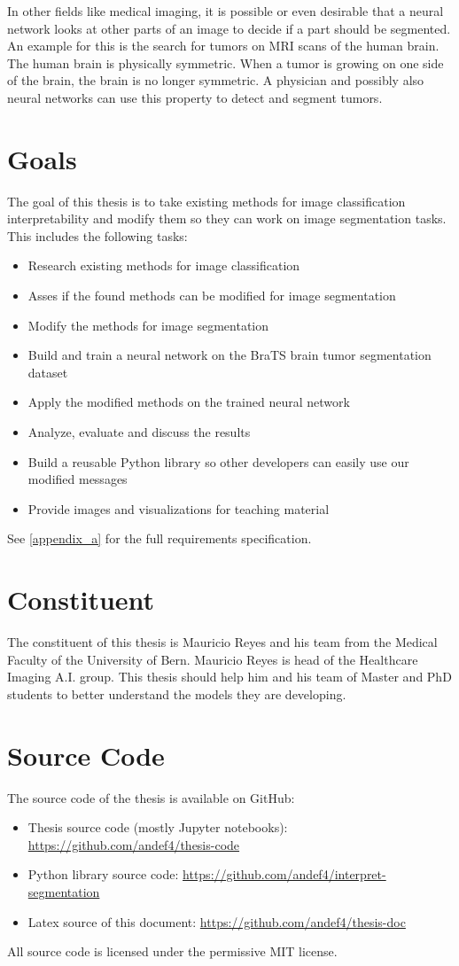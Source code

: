 In other fields like medical imaging, it is possible or even desirable that a neural network looks at other parts of an image to decide if a part should be segmented. An example for this is the search for tumors on MRI scans of the human brain. The human brain is physically symmetric. When a tumor is growing on one side of the brain, the brain is no longer symmetric. A physician and possibly also neural networks can use this property to detect and segment tumors.

\section{Goals}
The goal of this thesis is to take existing methods for image classification interpretability and modify them so they can work on image segmentation tasks. This includes the following tasks:
\begin{itemize}
    \item Research existing methods for image classification
    \item Asses if the found methods can be modified for image segmentation
    \item Modify the methods for image segmentation
    \item Build and train a neural network on the BraTS brain tumor segmentation dataset
    \item Apply the modified methods on the trained neural network
    \item Analyze, evaluate and discuss the results
    \item Build a reusable Python library so other developers can easily use our modified messages
    \item Provide images and visualizations for teaching material
\end{itemize}

See \autoref{appendix_a} for the full requirements specification.

\section{Constituent}
The constituent of this thesis is Mauricio Reyes and his team from the Medical Faculty of the University of Bern. Mauricio Reyes is head of the Healthcare Imaging A.I. group. This thesis should help him and his team of Master and PhD students to better understand the models they are developing.

\section{Source Code}
The source code of the thesis is available on GitHub:
\begin{itemize}
    \item Thesis source code (mostly Jupyter notebooks): \url{https://github.com/andef4/thesis-code}
    \item Python library source code: \url{https://github.com/andef4/interpret-segmentation}
    \item Latex source of this document: \url{https://github.com/andef4/thesis-doc}
\end{itemize}

All source code is licensed under the permissive MIT license.
